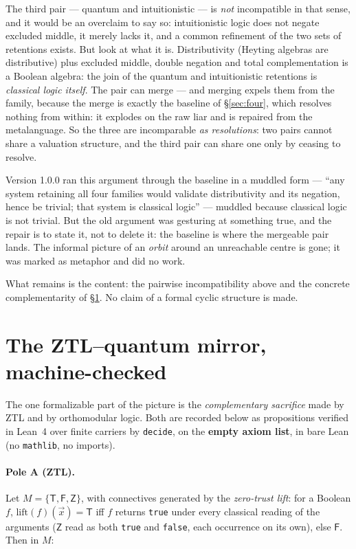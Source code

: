 \documentclass[11pt]{article}
\theoremstyle{remark}
\newcommand{\T}{\mathsf{T}}
\newcommand{\F}{\mathsf{F}}
\newcommand{\Zmark}{\mathsf{Z}}
\begin{document}
The third pair --- quantum and intuitionistic --- is \emph{not} incompatible
in that sense, and it would be an overclaim to say so: intuitionistic logic
does not negate excluded middle, it merely lacks it, and a common refinement
of the two sets of retentions exists. But look at what it is. Distributivity
(Heyting algebras are distributive) plus excluded middle, double negation
and total complementation is a Boolean algebra: the join of the quantum and
intuitionistic retentions is \emph{classical logic itself}. The pair can
merge --- and merging expels them from the family, because the merge is
exactly the baseline of \S\ref{sec:four}, which resolves nothing from
within: it explodes on the raw liar and is repaired from the metalanguage.
So the three are incomparable \emph{as resolutions}: two pairs cannot share
a valuation structure, and the third pair can share one only by ceasing to
resolve.

Version 1.0.0 ran this argument through the baseline in a muddled form ---
``any system retaining all four families would validate distributivity and
its negation, hence be trivial; that system is classical logic'' --- muddled
because classical logic is not trivial. But the old argument was gesturing at
something true, and the repair is to state it, not to delete it: the baseline
is where the mergeable pair lands. The informal picture of an \emph{orbit}
around an unreachable centre is gone; it was marked as metaphor and did no
work.

What remains is the content: the pairwise incompatibility above and the
concrete complementarity of \S\ref{sec:mirror}. No claim of a formal cyclic
structure is made.

\section{The ZTL--quantum mirror, machine-checked}\label{sec:mirror}

The one formalizable part of the picture is the \emph{complementary sacrifice}
made by ZTL and by orthomodular logic. Both are recorded below as
propositions verified in Lean~4 over finite carriers by \texttt{decide}, on
the \textbf{empty axiom list}, in bare Lean (no \texttt{mathlib}, no imports).

\paragraph{Pole A (ZTL).} Let $M = \{\T, \F, \Zmark\}$, with connectives
generated by the \emph{zero-trust lift}: for a Boolean $f$,
$\mathrm{lift}(f)(\vec{x}) = \T$ iff $f$ returns \texttt{true} under every
classical reading of the arguments ($\Zmark$ read as both \texttt{true} and
\texttt{false}, each occurrence on its own), else $\F$. Then in $M$:
\end{document}
